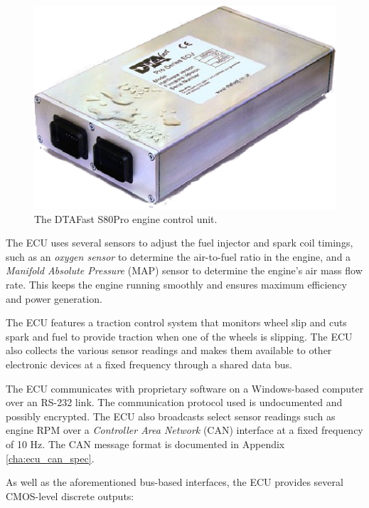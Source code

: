 \begin{figure}[H]
	\centering
		\includegraphics[scale=0.5]{background/figures/s80.eps}
	\caption{The DTAFast S80Pro engine control unit.}
	\label{fig:s80pro_product}
\end{figure}

The ECU uses several sensors to adjust the fuel injector and spark coil timings, such as an \emph{oxygen sensor} to determine the air-to-fuel ratio in the engine, and a \emph{Manifold Absolute Pressure} (MAP) sensor to determine the engine's air mass flow rate. This keeps the engine running smoothly and ensures maximum efficiency and power generation. 

The ECU features a traction control system that monitors wheel slip and cuts spark and fuel to provide traction when one of the wheels is slipping. The ECU also collects the various sensor readings and makes them available to other electronic devices at a fixed frequency through a shared data bus. 


The ECU communicates with proprietary software on a Windows-based computer over an RS-232 link. The communication protocol used is undocumented and possibly encrypted. The ECU also broadcasts select sensor readings such as engine RPM over a \emph{Controller Area Network} (CAN) interface at a fixed frequency of 10 Hz. The CAN message format is documented in Appendix \ref{cha:ecu_can_spec}.

As well as the aforementioned bus-based interfaces, the ECU provides several CMOS-level discrete outputs:

